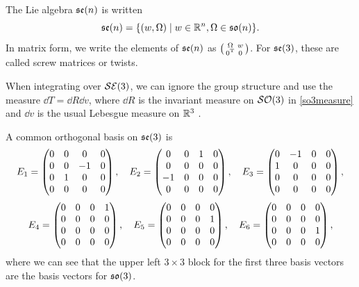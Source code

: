 \documentclass[../../main.tex]{subfiles}
\begin{document}
\begin{refsection}
	The Lie algebra $\mathfrak{se} (n)$ is written
	$$\mathfrak{se} (n)=\{(w, \Omega) \mid w \in \mathbb{R}^n, \Omega \in \mathfrak{so} (n) \}.$$
	In matrix form, we write the elements of $\mathfrak{se} (n)$ as $\smqty(\mat{\Omega} & \vec{w} \\ \trans{\vec{0}} & 0)$.
	For $\mathfrak{se} (3)$, these are called screw matrices or twists.

	When integrating over $\mathcal{SE} (3)$, we can ignore the group structure and use the measure $\dd{T} = \dd{R} \dd{v}$, where $\dd{R}$ is the invariant measure on $\mathcal{SO} (3)$ in \cref{so3measure} and $\dd{v}$ is the usual Lebesgue measure on $\mathbb{R}^3$ \cite[Section 12.1.3]{chirikjianStochasticModelsInformation2012}.

	A common orthogonal basis on $\mathfrak{se} (3)$ is
	$$
		\mat{E}_1 = \begin{pmatrix}
			0 & 0 & 0  & 0 \\
			0 & 0 & -1 & 0 \\
			0 & 1 & 0  & 0 \\
			0 & 0 & 0  & 0
		\end{pmatrix}, \quad
		\mat{E}_2 = \begin{pmatrix}
			0  & 0 & 1 & 0 \\
			0  & 0 & 0 & 0 \\
			-1 & 0 & 0 & 0 \\
			0  & 0 & 0 & 0
		\end{pmatrix}, \quad
		\mat{E}_3 = \begin{pmatrix}
			0 & -1 & 0 & 0 \\
			1 & 0  & 0 & 0 \\
			0 & 0  & 0 & 0 \\
			0 & 0  & 0 & 0
		\end{pmatrix},
	$$
	$$
		\mat{E}_4 = \begin{pmatrix}
			\mqty{\zmat{4}{3}} & \mqty{1 \\ 0 \\ 0 \\ 0}
		\end{pmatrix}, \quad
		\mat{E}_5 = \begin{pmatrix}
			\mqty{\zmat{4}{3}} & \mqty{0 \\ 1 \\ 0 \\ 0}
		\end{pmatrix}, \quad
		\mat{E}_6 = \begin{pmatrix}
			\mqty{\zmat{4}{3}} & \mqty{0 \\ 0 \\ 1 \\ 0}
		\end{pmatrix},
	$$
	where we can see that the upper left $3 \times 3$ block for the first three basis vectors are the basis vectors for $\mathfrak{so} (3)$.


\end{refsection}
\end{document}
